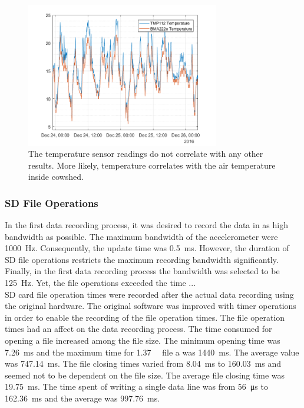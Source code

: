 \documentclass[english,12pt,a4paper,pdftex,elec,utf8]{aaltothesis}
\begin{document}
\begin{figure}[h]
\centering
\includegraphics[width = 0.75\textwidth]{figures/lehma9885temperature.png}
\caption{The temperature sensor readings do not correlate with any other results. More likely, temperature correlates with the air temperature inside cowshed.} \label{cowtemperature}
\end{figure}





\subsubsection{SD File Operations}

In the first data recording process, it was desired to record the data in as high bandwidth as possible. The maximum bandwidth of the accelerometer were \SI{1000}{\hertz}. Consequently, the update time was \SI{0.5}{\milli \second}. However, the duration of SD file operations restricts the maximum recording bandwidth significantly. Finally, in the first data recording process the bandwidth was selected to be \SI{125}{\hertz}. Yet, the file operations exceeded the time ... \\

SD card file operation times were recorded after the actual data recording using the original hardware. The original software was improved with timer operations in order to enable the recording of the file operation times. The file operation times had an affect on the data recording process. The time consumed for opening a file increased among the file size. The minimum opening time was \SI{7.26}{\milli\second} and the maximum time for \SI{1.37}{\giga \byte} file a was \SI{1440}{\milli \second}. The average value was \SI{747.14}{\milli \second}. The file closing times varied from \SI{8.04}{\milli \second} to \SI{160.03}{\milli \second} and seemed not to be dependent on the file size. The average file closing time was \SI{19.75}{\milli \second}. The time spent of writing a single data line was from \SI{56}{\micro \second} to \SI{162.36}{\milli\second} and the average was \SI{997.76}{\milli\second}. \\
\end{document}
